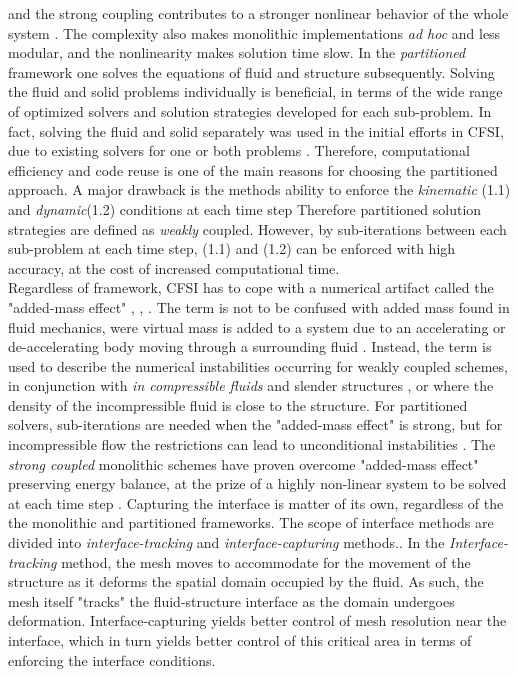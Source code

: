  and the strong coupling contributes to a stronger nonlinear behavior of the whole system \cite{Wick}. The complexity also makes monolithic implementations \textit{ad hoc} and less modular, and the nonlinearity makes solution time slow.
In the \textit{partitioned} framework one solves the equations of fluid and structure subsequently. Solving the fluid and solid problems individually is beneficial, in terms of the wide range of optimized solvers and solution strategies developed for each sub-problem. In fact, solving the fluid and solid separately was used in the initial efforts in CFSI, due to existing solvers for one or both problems \cite{Gatzhammer2014}. Therefore, computational efficiency and code reuse is one of the main reasons for choosing the partitioned approach. A major drawback is the methods ability to enforce the \textit{kinematic} (1.1) and \textit{dynamic}(1.2) conditions at each time step Therefore partitioned solution strategies are defined as  \textit{weakly} coupled. However, by sub-iterations between each sub-problem at each time step, (1.1) and (1.2) can be enforced with high accuracy, at the cost of increased computational time.  \\
Regardless of framework, CFSI has to cope with a numerical artifact called the "added-mass effect" \cite{Fernandez2007}, \cite{Fernandez2009}, \cite{Forster2007}. The term is not to be confused with added mass found in fluid mechanics, were virtual mass is added to a system due to an accelerating or de-accelerating body moving through a surrounding fluid \cite{Newman1977}. Instead, the term is used to describe the numerical instabilities occurring for weakly coupled schemes, in conjunction with \textit{in compressible fluids} and slender structures \cite{Forster2007}, or where the density of the incompressible fluid is close to the structure. For partitioned solvers, sub-iterations are needed when the "added-mass effect" is strong, but for incompressible flow the restrictions  can lead to unconditional instabilities \cite{Gatzhammer2014}. The \textit{strong coupled} monolithic schemes have proven overcome "added-mass effect" preserving energy balance, at the prize of a highly non-linear system to be solved at each time step \cite{Fernandez2007}.
Capturing the interface is matter of its own, regardless of the the monolithic and partitioned frameworks.
The scope of interface methods are divided into \textit{interface-tracking} and \textit{interface-capturing } methods.\cite{Frei2016}. In the \textit{Interface-tracking} method, the mesh moves to accommodate for the movement of the structure as it deforms the spatial domain occupied by the fluid. As such, the mesh itself "tracks" the fluid-structure interface as the domain undergoes deformation. Interface-capturing yields better control of mesh resolution near the interface, which in turn yields better control of this critical area in terms of enforcing the interface conditions.
